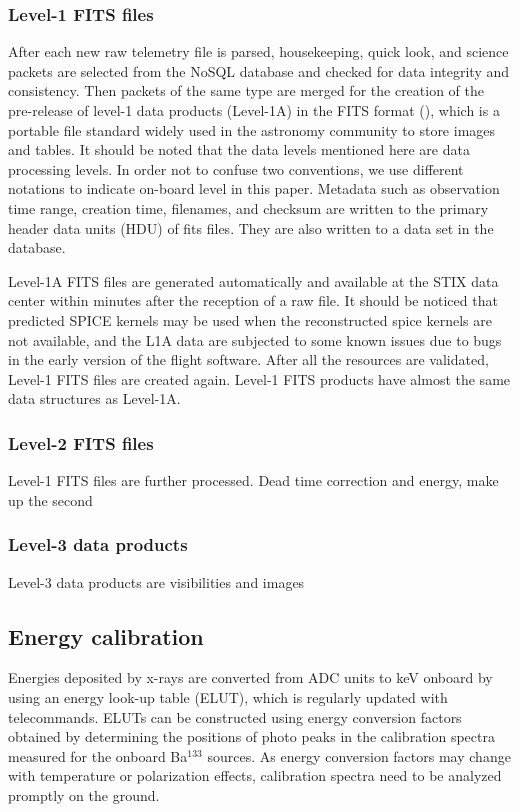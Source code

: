 \documentclass[referee]{aa} %
\begin{document}
\subsubsection{Level-1 FITS files}
After each new raw telemetry file is parsed, housekeeping, quick look, and science packets  
are selected from the NoSQL database 
and checked for data integrity and consistency. 
Then packets of the same type are merged for the creation of the pre-release of 
level-1 data products (Level-1A) 
 in the FITS format (\cite{fits}), 
which is a portable file standard widely used in the astronomy 
community to store images and tables.
It should be noted that the data levels mentioned here are data processing levels. 
In order not to confuse two conventions, we use different notations to indicate on-board level in this paper. 
Metadata such as observation time range, creation time, filenames, and checksum are written to 
the primary header data units (HDU) of fits files. They are also written to a data set in the database.

Level-1A FITS files are generated automatically and available at the STIX data center within minutes 
after the reception of a raw file.  It should be noticed that predicted SPICE kernels may be used 
when the reconstructed spice kernels  
are not available, and the L1A data are subjected to some known issues 
due to bugs in the early version of the flight software.
After all the resources are validated,  Level-1  FITS files are created again. 
Level-1  FITS products have almost the same data structures as Level-1A.
\subsubsection{Level-2 FITS files}
Level-1 FITS files are further processed. 
Dead time  correction and energy, make up the second
\subsubsection{Level-3 data products}
Level-3 data products are visibilities and images

\subsection{Energy calibration}
Energies deposited by x-rays are converted from ADC units to keV onboard by using an energy look-up table (ELUT),
which is regularly updated with telecommands.  
ELUTs can be constructed using energy conversion factors obtained by determining the 
positions of photo peaks in the calibration spectra measured for the onboard Ba$^{133}$ sources.  
As energy conversion factors may change with temperature 
or polarization effects,  calibration spectra need to be analyzed promptly on the ground. 
\end{document}
